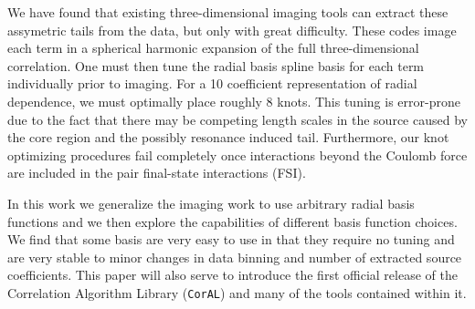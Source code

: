 \documentclass[aps,prl,twocolumn,floatfix,preprintnumbers,showpacs]{revtex4}
\newcommand{\CorAL}{{\tt CorAL}}
\begin{document}
We have found that existing three-dimensional imaging tools can extract these assymetric tails from the data, but only with great difficulty.  These codes image each term in a spherical harmonic expansion of the full three-dimensional correlation.  One must then tune the radial basis spline basis for each term individually prior to imaging.  For a 10 coefficient representation of radial dependence, we must optimally place roughly 8 knots.  This tuning is error-prone due to the fact that there may be competing length scales in the source caused by the core region and the possibly resonance induced tail.  Furthermore, our knot optimizing procedures fail completely once interactions beyond the Coulomb force are included in the pair final-state interactions (FSI).    

In this work we generalize the imaging work to use arbitrary radial basis functions and we then explore the capabilities of different basis function choices.  We find that some basis are very easy to use in that they require no tuning and are very stable to minor changes in data binning and number of extracted source coefficients.  This paper will also serve to introduce the first official release of the Correlation Algorithm Library (\CorAL) and many of the tools contained within it.  
\end{document}
